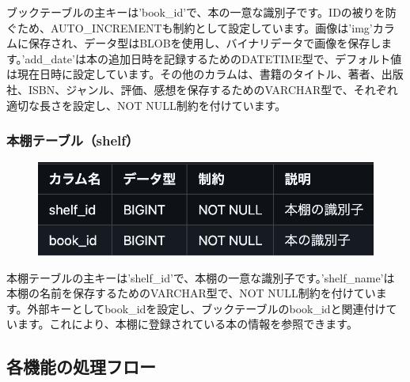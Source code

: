 \documentclass[a4paper, 11pt, titlepage]{jsarticle}
\begin{document}
ブックテーブルの主キーは'book\_id'で、本の一意な識別子です。IDの被りを防ぐため、AUTO\_INCREMENTも制約として設定しています。画像は'img'カラムに保存され、データ型はBLOBを使用し、バイナリデータで画像を保存します。'add\_date'は本の追加日時を記録するためのDATETIME型で、デフォルト値は現在日時に設定しています。その他のカラムは、書籍のタイトル、著者、出版社、ISBN、ジャンル、評価、感想を保存するためのVARCHAR型で、それぞれ適切な長さを設定し、NOT NULL制約を付けています。

\subsubsection{本棚テーブル（shelf）}
\begin{figure}[htbp]
\centering
\includegraphics[width=120mm]{databaseshelf.png}
\label{fig:func}
\end{figure}

本棚テーブルの主キーは'shelf\_id'で、本棚の一意な識別子です。'shelf\_name'は本棚の名前を保存するためのVARCHAR型で、NOT NULL制約を付けています。外部キーとしてbook\_idを設定し、ブックテーブルのbook\_idと関連付けています。これにより、本棚に登録されている本の情報を参照できます。

\clearpage
\subsection{各機能の処理フロー}
\end{document}

